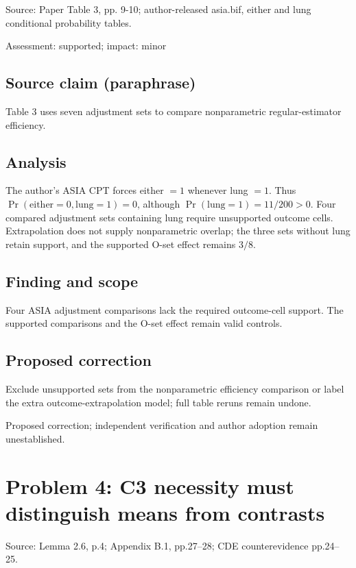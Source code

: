 \documentclass[11pt]{article}
\begin{document}
Source: Paper Table 3, pp. 9-10; author-released asia.bif, either and lung conditional probability tables.

Assessment: supported; impact: minor

\subsection*{Source claim (paraphrase)}

Table 3 uses seven adjustment sets to compare nonparametric regular-estimator efficiency.

\subsection*{Analysis}

The author's ASIA CPT forces either \(=1\) whenever lung \(=1\). Thus \(\Pr(\mathrm{either}=0,\mathrm{lung}=1)=0\), although \(\Pr(\mathrm{lung}=1)=11/200>0\). Four compared adjustment sets containing lung require unsupported outcome cells. Extrapolation does not supply nonparametric overlap; the three sets without lung retain support, and the supported O-set effect remains \(3/8\).

\subsection*{Finding and scope}

Four ASIA adjustment comparisons lack the required outcome-cell support. The supported comparisons and the O-set effect remain valid controls.

\subsection*{Proposed correction}

Exclude unsupported sets from the nonparametric efficiency comparison or label the extra outcome-extrapolation model; full table reruns remain undone.

Proposed correction; independent verification and author adoption remain unestablished.

\section*{Problem 4: C3 necessity must distinguish means from contrasts}

Source: Lemma 2.6, p.4; Appendix B.1, pp.27–28; CDE counterevidence pp.24–25.
\end{document}
